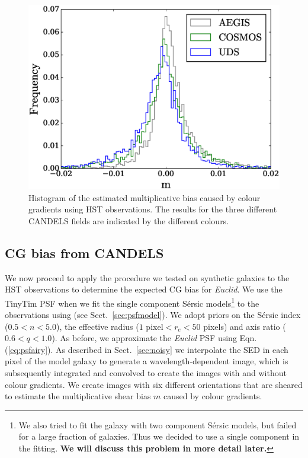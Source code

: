 \documentclass[useAMS,usenatbib]{mnras}
\begin{document}
%
\begin{figure}
  \includegraphics[width=\hsize]{zhiscgb.eps}
\caption{Histogram of the estimated multiplicative bias caused by colour gradients using HST
observations. The results for the three different CANDELS fields are indicated by the different
colours.}
\label{fig:cgbhis}
\end{figure}

\subsection{CG bias from CANDELS}

We now proceed to apply the procedure we tested on synthetic galaxies to the HST observations to determine the expected CG bias for {\it Euclid}. We use the {\sc TinyTim} PSF when we fit the single component S{\'e}rsic models\footnote{We also tried to fit the galaxy with two component S{\'e}rsic models, but failed for a large fraction of galaxies. Thus we decided to use a single component in the fitting. {\bf We will discuss this problem in more detail later.} } to the observations using {} (see Sect.~\ref{sec:psfmodel}).
We adopt priors on the S{\'e}rsic index ($0.5<n<5.0$), the effective radius ($1$ pixel$<r_e<50$ pixels) and axis ratio ($0.6<q<1.0$). As before, we approximate the {\it Euclid} PSF using Eqn.\,(\ref{eq:psfairy}).  As described in Sect.~\ref{sec:noisy} we interpolate the SED in each pixel of the model galaxy to generate a wavelength-dependent image, which is subsequently integrated and convolved to  create the images with and without colour gradients. We create images with six different orientations that are sheared to estimate the multiplicative shear bias $m$ caused by colour gradients.
\end{document}
